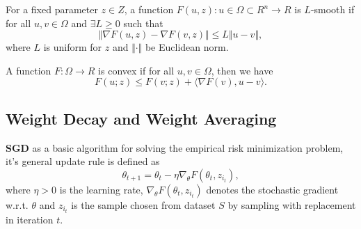 
\begin{definition}[$L$-smooth]
For a fixed parameter $z\in Z$, a function $F(u,z):u\in\Omega \subset R^n \rightarrow R$ is $L$-smooth if for all $u, v \in \Omega$ and $\exists L\geq 0$ such that 
    \begin{equation}\label{eq:beta-smooth}
     \Vert\nabla F(u,z)-\nabla F(v,z)\Vert \leq L\Vert u-v\Vert,
    \end{equation} 
where $L$ is uniform for $z$ and $\Vert\cdot\Vert$ be Euclidean norm.
\end{definition}


\begin{definition}
A function $F: \Omega \rightarrow R$ is convex if for all $u, v \in \Omega $, then we have
    \begin{equation}\label{eq:convex-function}
     F(u;z) \leq F(v;z) + \langle\nabla F(v), u-v \rangle.
    \end{equation}  
\end{definition}


\subsection{Weight Decay and Weight Averaging}

\textbf{SGD} as a basic algorithm for solving the empirical risk minimization problem, it's general update rule is defined as 
\begin{equation}\label{SGD-rules}
   \theta_{t+1} = \theta_{t} - \eta \nabla_\theta F(\theta_{t},z_{i_t}),
\end{equation} 
where $\eta > 0 $ is the learning rate, $\nabla_\theta F(\theta_{t},z_{i_t})$ denotes the stochastic gradient w.r.t. $\theta$ and $z_{i_t}$ is the sample chosen from dataset $S$ by sampling with replacement in iteration $t$. 

